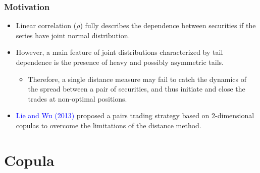 \documentclass[pdf,9pt,xcolor=dvipsnames,hide notes]{beamer}
\begin{document}
	
	\begin{frame}[label=frame1c]
		\frametitle{Motivation}
		
		\begin{itemize}
			\justifying
			
			\item Linear correlation ($\rho$) fully describes the dependence between securities if the series have joint normal distribution. 
			
			\vspace{0.3cm}
			
			\item   However, a main feature of joint distributions characterized by tail dependence is the presence of heavy and possibly asymmetric tails. 
			
			\begin{itemize}
				\item Therefore, a single distance measure may fail to catch the dynamics of the spread between a pair of securities, and thus initiate and close the trades at non-optimal positions.
			\end{itemize}
			
			\vspace{0.3cm}
			
			\item \textcolor{blue}{Lie and Wu} \textcolor{blue}{(2013)} proposed a pairs trading strategy based on 2-dimensional copulas to overcome the limitations of the distance method.
			
			\vspace{0.3cm}
			
		
		\end{itemize}
	\end{frame}

\section{Copula}
	
\end{document}
